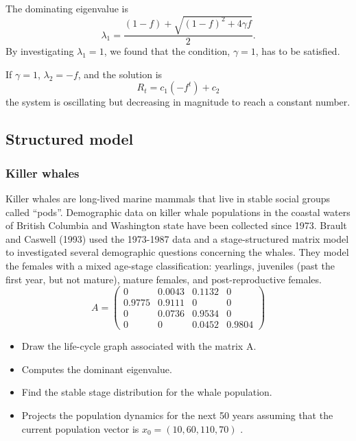 The dominating eigenvalue is 
$$\lambda_{1}=\frac{(1-f)+ \sqrt{(1-f)^2 + 4 \gamma f}}{2}.$$
By investigating $\lambda _1= 1$, we found that the condition, $\gamma =1$, has to be satisfied.


If $\gamma =1$, $\lambda _2= -f$, and the solution is
$$R_t= c_1 (-f^{t}) +c_2$$
the system is oscillating but decreasing in magnitude to reach a constant number.



\subsection{Structured model}

\subsubsection{Killer whales}
Killer whales are long-lived marine mammals that live in stable
social groups called ``pods''. Demographic
data on killer whale populations in the coastal waters of British Columbia and Washington
state have been collected since 1973. Brault and Caswell (1993) used the 1973-1987 data and
a stage-structured matrix model to investigated several demographic questions concerning the
whales. They model the females with a mixed age-stage classification: yearlings, juveniles (past
the first year, but not mature), mature females, and post-reproductive females. 
$$
A =\left (\begin{array}{cccc}
0 & 0.0043 & 0.1132 & 0\\
0.9775 & 0.9111 & 0 & 0\\
0 & 0.0736 & 0.9534 & 0\\
0 & 0 & 0.0452 & 0.9804
\end{array}\right )$$
\begin{itemize}
\item Draw the life-cycle graph associated with the matrix A.
\item Computes the dominant eigenvalue. 
\item Find the stable stage distribution for the whale population.
\item Projects the population dynamics for the next 50 years assuming that the current population
vector is $x_0 = (10, 60, 110, 70)$ .
\end{itemize}


